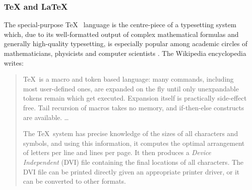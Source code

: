 %
%
%
%
%
%
%

\subsubsection{TeX and LaTeX}
\label{tex_and_latex_heading}

The special-purpose \TeX\ \cite{tex} language is the centre-piece of a
typesetting system which, due to its well-formatted output of complex
mathematical formulas and generally high-quality typesetting, is especially
popular among academic circles of mathematicians, physicists and computer
scientists \cite{latextutorial}. The Wikipedia encyclopedia \cite{wikipedia}
writes:

\begin{quote}
    \TeX\ is a macro and token based language: many commands, including most
    user-defined ones, are expanded on the fly until only unexpandable tokens
    remain which get executed. Expansion itself is practically side-effect free.
    Tail recursion of macros takes no memory, and if-then-else constructs are
    available. \ldots

    The \TeX\ system has precise knowledge of the sizes of all characters and
    symbols, and using this information, it computes the optimal arrangement of
    letters per line and lines per page. It then produces a \emph{Device Independent}
    (DVI) file containing the final locations of all characters. The DVI file
    can be printed directly given an appropriate printer driver, or it can be
    converted to other formats.
\end{quote}

